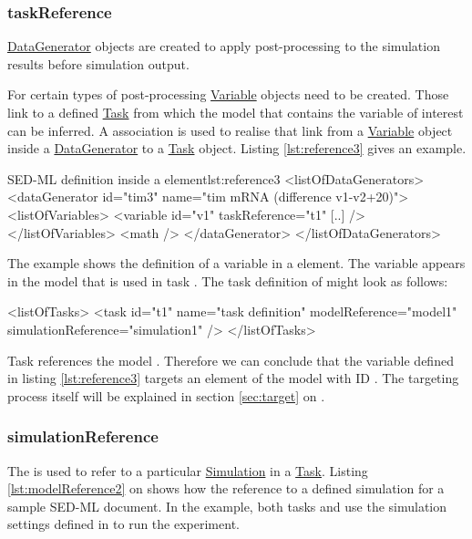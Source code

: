 \subsubsection{taskReference}
\label{sec:taskReference}
\hyperref[class:dataGenerator]{DataGenerator} objects are created to apply post-processing to the simulation results before simulation output. 

For certain types of post-processing \hyperref[class:variable]{Variable} objects need to be created. Those link to a defined \hyperref[class:task]{Task} from which the model that contains the variable of interest can be inferred. 
A  association is used to realise that link from a \hyperref[class:variable]{Variable} object inside a \hyperref[class:dataGenerator]{DataGenerator} to a \hyperref[class:task]{Task} object. 
Listing \ref{lst:reference3} gives an example.
%
\begin{myXmlLst}{SED-ML  definition inside a  element}{lst:reference3}
<listOfDataGenerators>
 <dataGenerator id="tim3" name="tim mRNA (difference v1-v2+20)">
  <listOfVariables>
   <variable id="v1" taskReference="t1" [..] />
  </listOfVariables>
  <math />
 </dataGenerator>
</listOfDataGenerators>
\end{myXmlLst}
%
The example shows the definition of a variable  in a  element. The variable appears in the model that is used in task . The task definition of  might look as follows:
\begin{myXmlLst}{}{}
<listOfTasks>
  <task id="t1" name="task definition" modelReference="model1" 
        simulationReference="simulation1" />
</listOfTasks>
\end{myXmlLst}
Task  references the model . Therefore we can conclude that the variable  defined in listing \ref{lst:reference3} targets an element of the model with ID . The targeting process itself will be explained in section \ref{sec:target} on .

\subsubsection{simulationReference}
\label{sec:simulationReference}
The  is used to refer to a particular \hyperref[class:simulation]{Simulation} in a \hyperref[class:task]{Task}. 
Listing \ref{lst:modelReference2}  on  shows how the reference to a defined simulation for a sample SED-ML document. In the example, both tasks  and  use the simulation settings defined in  to run the experiment.
